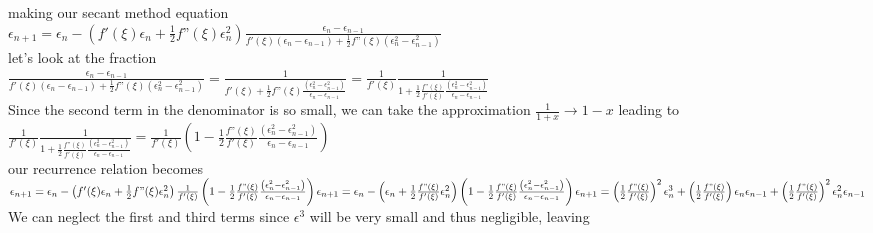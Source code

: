 \documentclass{article}
\begin{document}
making our secant method equation\\
\(\epsilon _{n+1}=\epsilon _n-\left(f'(\xi )\epsilon _n+\frac{1}{2}f\text{''}(\xi )\epsilon _n^2\right)\frac{\epsilon _n-\epsilon _{n-1}}{f'(\xi
)\left(\epsilon _n-\epsilon _{n-1}\right)+\frac{1}{2}f\text{''}(\xi )\left(\epsilon _n^2-\epsilon _{n-1}^2\right)}\)\\
let{'}s look at the fraction\\
\(\frac{\epsilon _n-\epsilon _{n-1}}{f'(\xi )\left(\epsilon _n-\epsilon _{n-1}\right)+\frac{1}{2}f\text{''}(\xi )\left(\epsilon _n^2-\epsilon _{n-1}^2\right)}=\frac{1}{f'(\xi
)+\frac{1}{2}f\text{''}(\xi )\frac{\left(\epsilon _n^2-\epsilon _{n-1}^2\right)}{\epsilon _n-\epsilon _{n-1}}}=\frac{1}{f'(\xi )}\frac{1}{1+\frac{1}{2}\frac{f\text{''}(\xi
)}{f'(\xi )}\frac{\left(\epsilon _n^2-\epsilon _{n-1}^2\right)}{\epsilon _n-\epsilon _{n-1}}}\)\\
Since the second term in the denominator is so small, we can take the approximation \(\frac{1}{1+x}\to  1-x\) leading to\\
\(\frac{1}{f'(\xi )}\frac{1}{1+\frac{1}{2}\frac{f\text{''}(\xi )}{f'(\xi )}\frac{\left(\epsilon _n^2-\epsilon _{n-1}^2\right)}{\epsilon _n-\epsilon
_{n-1}}}=\frac{1}{f'(\xi )}\left(1-\frac{1}{2}\frac{f\text{''}(\xi )}{f'(\xi )}\frac{\left(\epsilon _n^2-\epsilon _{n-1}^2\right)}{\epsilon _n-\epsilon
_{n-1}}\right)\)\\
our recurrence relation becomes\\
\(\epsilon _{n+1}=\epsilon _n-\left(f'(\xi )\epsilon _n+\frac{1}{2}f\text{''}(\xi )\epsilon _n^2\right)\frac{1}{f'(\xi )}\left(1-\frac{1}{2}\frac{f\text{''}(\xi
)}{f'(\xi )}\frac{\left(\epsilon _n^2-\epsilon _{n-1}^2\right)}{\epsilon _n-\epsilon _{n-1}}\right)\\
\\
\epsilon _{n+1}=\epsilon _n-\left(\epsilon _n+\frac{1}{2}\frac{f\text{''}(\xi )}{f'(\xi )}\epsilon _n^2\right)\left(1-\frac{1}{2}\frac{f\text{''}(\xi
)}{f'(\xi )}\frac{\left(\epsilon _n^2-\epsilon _{n-1}^2\right)}{\epsilon _n-\epsilon _{n-1}}\right)\\
\\
\epsilon _{n+1}= \left(\frac{1}{2}\frac{f\text{''}(\xi )}{f'(\xi )}\right)^2 \epsilon _n^3+\left(\frac{1}{2}\frac{f\text{''}(\xi )}{f'(\xi )}\right)\epsilon
_n\epsilon _{n-1} +\left(\frac{1}{2}\frac{f\text{''}(\xi )}{f'(\xi )}\right)^2\epsilon _n^2\epsilon _{n-1}\)\\
We can neglect the first and third terms since \(\epsilon ^3\) will be very small and thus negligible, leaving\\
\end{document}
